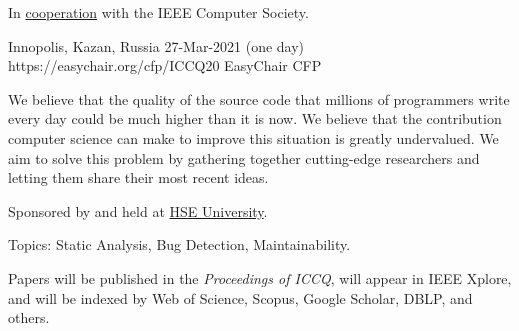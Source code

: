 \documentclass{../cfp}
\begin{document}
\PrintLogo{}


In
\href{https://conferences.ieee.org/conferences_events/conferences/conferencedetails/51190}{cooperation}
with the IEEE Computer Society.

\vspace{6pt}

\PrintAddress
  {Innopolis, Kazan, Russia}
  {27-Mar-2021 (one day)}
  {https://easychair.org/cfp/ICCQ20}
  {EasyChair CFP}

\vspace{12pt}

%
%
%

\vspace{6pt}

We believe that the quality of the source code that millions of programmers
write every day could be much higher than it is now. We believe that the
contribution computer science can make to improve this situation is greatly
undervalued. We aim to solve this problem by gathering
together cutting-edge researchers and letting them share their most recent ideas.

Sponsored by and held at \href{https://www.hse.ru/en/}{HSE University}.

Topics: Static Analysis, Bug Detection, Maintainability.

Papers will be published in the \textit{Proceedings of ICCQ},
will appear in IEEE Xplore\textsuperscript{\textregistered},
and will be indexed by Web of Science, Scopus, Google Scholar, DBLP, and others.
\end{document}
